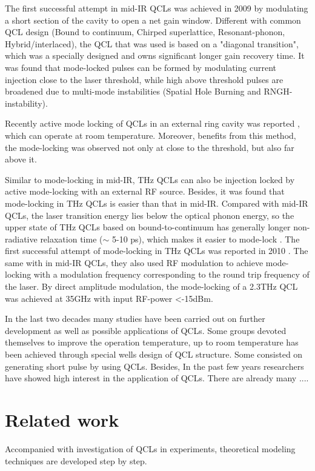 \documentclass[11pt,final]{scrbook}
\begin{document}
The first successful attempt in mid-IR QCLs was achieved in 2009 \cite{wang2009mode} by modulating a short section of the cavity to open a net gain window. Different with common QCL design (Bound to continuum, Chirped superlattice, Resonant-phonon, Hybrid/interlaced), the QCL that was used is based on a "diagonal transition", which was a specially designed and owns significant longer gain recovery time. It was found that mode-locked pulses can be formed by modulating current injection close to the laser threshold, while high above threshold pulses are broadened due to multi-mode instabilities (Spatial Hole Burning and RNGH-instability).

Recently active mode locking of QCLs in an external ring cavity was reported \cite{revin2016active}, which can operate at room temperature. Moreover, benefits from this method, the mode-locking was observed not only at close to the threshold, but also far above it. 

Similar to mode-locking in mid-IR, THz QCLs can also be injection locked by active mode-locking with an external RF source. Besides, it was found that mode-locking in THz QCLs is easier than that in mid-IR. Compared with mid-IR QCLs, the laser transition energy lies below the optical phonon energy, so the upper state of THz QCLs based on bound-to-continuum has generally longer non-radiative relaxation time ($\sim$ 5-10 ps), which makes it easier to mode-lock \cite{barbieri2011coherent}. The first successful attempt of mode-locking in THz QCLs was reported in 2010 \cite{gellie2010injection}. The same with in mid-IR QCLs, they also used RF modulation to achieve mode-locking with a modulation frequency corresponding to the round trip frequency of the laser. By direct amplitude modulation, the mode-locking of a 2.3THz QCL was achieved at 35GHz with input RF-power <-15dBm.

In the last two decades many studies have been carried out on further development as well as possible applications of QCLs. Some groups devoted themselves to improve the operation temperature, up to room temperature has been achieved\cite{bai2011room} through special wells design of QCL structure. Some consisted on generating short pulse by using QCLs\cite{wang2009mode}. Besides, In the past few years researchers have showed high interest in the application of QCLs. There are already many 
....


\section{Related work}
Accompanied with investigation of QCLs in experiments, theoretical modeling techniques are developed step by step.
\end{document}
